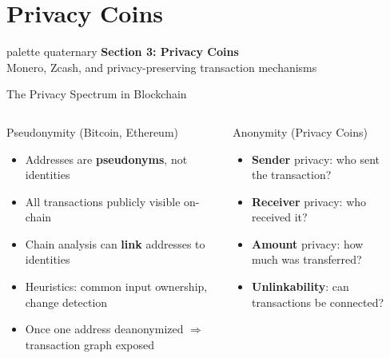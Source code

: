 \documentclass[8pt,aspectratio=169]{beamer}
\begin{document}
\section{Privacy Coins}

\begin{frame}{}
\begin{beamercolorbox}[sep=12pt,center,rounded=true,shadow=true]{palette quaternary}
{\Large\bfseries Section 3: Privacy Coins}\\[6pt]
{\normalsize Monero, Zcash, and privacy-preserving transaction mechanisms}
\end{beamercolorbox}
\end{frame}

\begin{frame}{The Privacy Spectrum in Blockchain}
\begin{columns}[T]
\begin{block}{\footnotesize Pseudonymity (Bitcoin, Ethereum)}
\footnotesize
\begin{itemize}
\item Addresses are \textbf{pseudonyms}, not identities
\item All transactions publicly visible on-chain
\item Chain analysis can \textbf{link} addresses to identities
\item Heuristics: common input ownership, change detection
\item Once one address deanonymized $\Rightarrow$ transaction graph exposed
\end{itemize}
\end{block}
\begin{alertblock}{\footnotesize Anonymity (Privacy Coins)}
\footnotesize
\begin{itemize}
\item \textbf{Sender} privacy: who sent the transaction?
\item \textbf{Receiver} privacy: who received it?
\item \textbf{Amount} privacy: how much was transferred?
\item \textbf{Unlinkability}: can transactions be connected?
\end{itemize}
\end{alertblock}
\begin{center}
\end{center}
\end{columns}
\end{frame}
\end{document}
